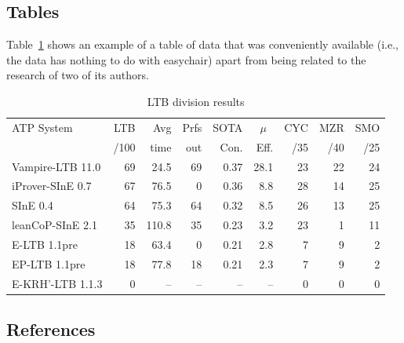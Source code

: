 \documentclass[]{easychair}
\newcommand{\easychair}{\textsf{easychair}}
\begin{document}
\subsection{Tables}
\label{sect:tables}

Table~\ref{tab:ltbexample} shows an example of a table of data that was
conveniently available (i.e., the data has nothing to do with
{\easychair}) apart from being related to the research of two of its
authors. 

\begin{table}[htp]
	\begin{centering}
		\begin{tabular}{lrrrrrrrr}
		\hline
		ATP System            & LTB & Avg  &Prfs & SOTA & \multicolumn{1}{c}{$\mu$} & CYC & MZR & SMO \\
		                      & /100& time & out & Con. & Eff. & /35 & /40 & /25 \\
		\hline
		Vampire-LTB 11.0      &  69 & 24.5 &  69 & 0.37 & 28.1 &  23 &  22 &  24 \\
		iProver-SInE 0.7      &  67 & 76.5 &   0 & 0.36 &  8.8 &  28 &  14 &  25 \\
		SInE 0.4              &  64 & 75.3 &  64 & 0.32 &  8.5 &  26 &  13 &  25 \\
		leanCoP-SInE 2.1      &  35 &110.8 &  35 & 0.23 &  3.2 &  23 &   1 &  11 \\
		E-LTB 1.1pre          &  18 & 63.4 &   0 & 0.21 &  2.8 &   7 &   9 &   2 \\
		EP-LTB 1.1pre         &  18 & 77.8 &  18 & 0.21 &  2.3 &   7 &   9 &   2 \\
		E-KRH'-LTB 1.1.3      &   0 &   -- &  -- &   -- &   -- &   0 &   0 &   0 \\
		\hline
		\end{tabular}
		\caption{LTB division results}
		\label{tab:ltbexample}
	\end{centering}
\end{table}

\subsection{References}
\label{sect:references}
\end{document}
